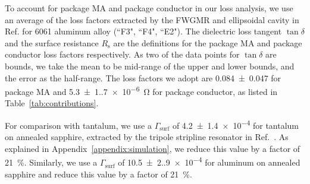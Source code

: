 \documentclass[
    reprint,
    superscriptaddress,
    amsmath,amssymb,
    aps,
    prb,
    floatfix,
]{revtex4-2}
\begin{document}
To account for package MA and package conductor in our loss analysis, we use an average of the loss factors extracted by the FWGMR and ellipsoidal cavity in Ref. \cite{lei2023} for 6061 aluminum alloy (``F3", ``F4", ``E2"). The dielectric loss tangent $\tan\delta$ and the surface resistance $R_\mathrm{s}$ are the definitions for the package MA and package conductor loss factors respectively. As two of the data points for $\tan\delta$ are bounds, we take the mean to be mid-range of the upper and lower bounds, and the error as the half-range. The loss factors we adopt are \num{0.084(47)} for package MA and \SI{5.3(1.7)e-6}{\ohm} for package conductor, as listed in Table~\ref{tab:contributions}.

For comparison with tantalum, we use a $\Gamma_\mathrm{surf}$ of \num{4.2(14)e-4} for tantalum on annealed sapphire, extracted by the tripole stripline resonator in Ref.~\cite{ganjam2024}. As explained in Appendix~\ref{appendix:simulation}, we reduce this value by a factor of \SI{21}{\percent}. Similarly, we use a $\Gamma_\mathrm{surf}$ of \num{10.5(2.9)e-4} for aluminum on annealed sapphire and reduce this value by a factor of \SI{21}{\percent}.
\end{document}
